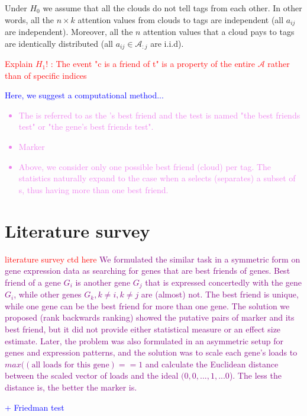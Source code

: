 \documentclass{llncs}
\begin{document}
Under $H_0$ we assume that all the clouds do not tell tags from each other.
In other words, all the $n \times k$ attention values from clouds to tags are independent (all $a_{ij}$ are independent). Moreover, all the $n$ attention values that a cloud pays to tags are identically distributed (all $a_{ij} \in \mathcal{A}_{:j}$ are i.i.d).

\textcolor{red}{Explain $H_1$! : The event "c is a friend of t" is a property of the entire $\mathcal{A}$ rather than of specific indices}

\textcolor{blue}{Here, we suggest a computational method...}

\textcolor{violet}{\begin{itemize}
    \item The {\cloud} is referred to as the {\tag}'s best friend and the test is named "the best friends test" or "the gene's best friends test".
    \item Marker
    \item Above, we consider only one possible best friend (cloud) per tag. The statistics naturally expand to the case when a {\tag} selects (separates) a subset of {\cloud}s, thus having more than one best friend.
\end{itemize}}


\section{Literature survey}
\textcolor{red}{literature survey ctd here}
\textcolor{purple}{We formulated \cite{best_friends:2015} the similar task in a symmetric form on gene expression data as searching for genes that are best friends of genes. Best friend of a gene $G_i$ is another gene $G_j$ that is expressed concertedly with the gene $G_i$, while other genes $G_k, k\neq i, k \neq j$ are (almost) not. The best friend is unique, while one gene can be the best friend for more than one gene. The solution we proposed (rank backwards ranking) showed the putative pairs of marker and its best friend, but it did not provide either statistical measure or an effect size estimate. Later, the problem was also formulated in an asymmetric setup \cite{patternmarkers:2017} for genes and expression patterns, and the solution was to scale each gene's loads to $max((\mbox{all loads for this gene})==1$ and calculate the Euclidean distance between the scaled vector of loads and the ideal $(0,0,...,1,...0$). The less the distance is, the better the marker is. }

\textcolor{blue}{+ Friedman test }
\end{document}
